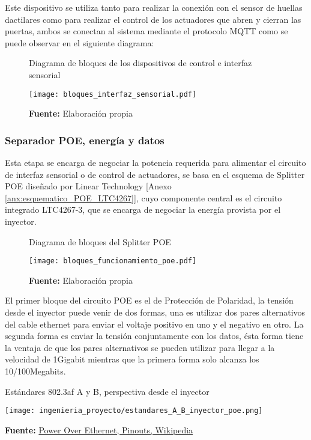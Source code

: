 \documentclass[../principal]{subfiles}
\begin{document}
  Este dispositivo se utiliza tanto para realizar la conexión con el sensor de huellas dactilares como para realizar el control de los actuadores que abren y cierran las puertas, ambos se conectan al sistema mediante el protocolo MQTT como se puede observar en el siguiente diagrama:

  \begin{figure}[H]
    \centering
    \caption{Diagrama de bloques de los dispositivos de control e interfaz sensorial}
    \texttt{[image: bloques\_interfaz\_sensorial.pdf]}
    \caption*{\textbf{Fuente:} Elaboración propia}
  \end{figure}

  \subsubsection{Separador POE, energía y datos}

  Esta etapa se encarga de negociar la potencia requerida para alimentar el circuito de interfaz sensorial o de control de actuadores, se basa en el esquema de Splitter POE diseñado por Linear Technology [Anexo \ref{anx:esquematico_POE_LTC4267}], cuyo componente central es el circuito integrado LTC4267-3, que se encarga de negociar la energía provista por el inyector.

  \begin{figure}[H]
    \centering
    \caption{Diagrama de bloques del Splitter POE}
    \texttt{[image: bloques\_funcionamiento\_poe.pdf]}
    \caption*{\textbf{Fuente:} Elaboración propia}
  \end{figure}

  El primer bloque del circuito POE es el de Protección de Polaridad, la tensión desde el inyector puede venir de dos formas, una es utilizar dos pares alternativos del cable ethernet para enviar el voltaje positivo en uno y el negativo en otro. La segunda forma es enviar la tensión conjuntamente con los datos, ésta forma tiene la ventaja de que los pares alternativos se pueden utilizar para llegar a la velocidad de 1Gigabit mientras que la primera forma solo alcanza los 10/100Megabits.

  \begin{table}[H]
    \caption{Estándares 802.3af A y B, perspectiva desde el inyector}
    \centering
    \texttt{[image: ingenieria\_proyecto/estandares\_A\_B\_inyector\_poe.png]}
    \caption*{\textbf{Fuente:} \href{https://en.wikipedia.org/wiki/Power_over_Ethernet}{Power Over Ethernet, Pinouts, Wikipedia}}
  \end{table}
\end{document}
